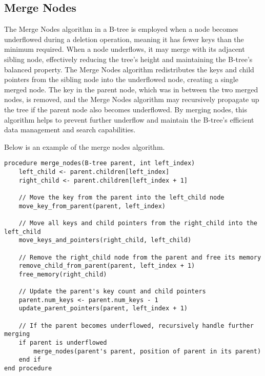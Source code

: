 \subsection*{Merge Nodes}

The Merge Nodes algorithm in a B-tree is employed when a node becomes underflowed during a deletion operation, meaning it has fewer keys than the minimum required. When a node underflows, it may merge with its 
adjacent sibling node, effectively reducing the tree's height and maintaining the B-tree's balanced property. The Merge Nodes algorithm redistributes the keys and child pointers from the sibling node into the 
underflowed node, creating a single merged node. The key in the parent node, which was in between the two merged nodes, is removed, and the Merge Nodes algorithm may recursively propagate up the tree if the 
parent node also becomes underflowed. By merging nodes, this algorithm helps to prevent further underflow and maintain the B-tree's efficient data management and search capabilities.

\begin{highlight}

Below is an example of the merge nodes algorithm.

\horizontalline

\begin{verbatim}
procedure merge_nodes(B-tree parent, int left_index)
    left_child <- parent.children[left_index]
    right_child <- parent.children[left_index + 1]

    // Move the key from the parent into the left_child node
    move_key_from_parent(parent, left_index)

    // Move all keys and child pointers from the right_child into the left_child
    move_keys_and_pointers(right_child, left_child)

    // Remove the right_child node from the parent and free its memory
    remove_child_from_parent(parent, left_index + 1)
    free_memory(right_child)

    // Update the parent's key count and child pointers
    parent.num_keys <- parent.num_keys - 1
    update_parent_pointers(parent, left_index + 1)

    // If the parent becomes underflowed, recursively handle further merging
    if parent is underflowed
        merge_nodes(parent's parent, position of parent in its parent)
    end if
end procedure
\end{verbatim}

\end{highlight}

